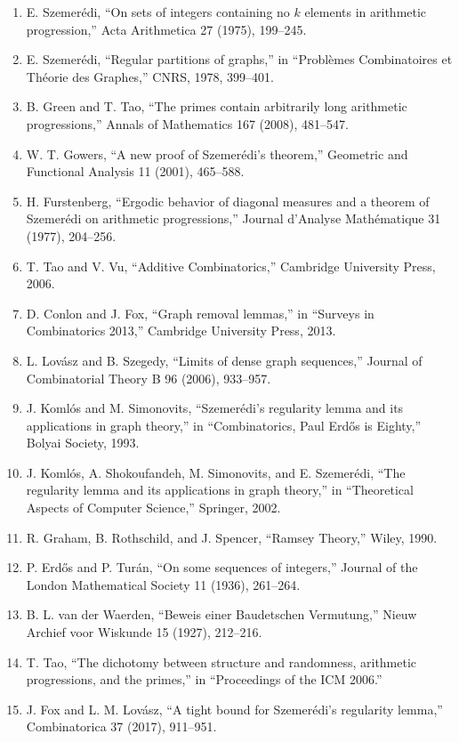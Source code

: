\begin{enumerate}
\item E. Szemer\'edi, ``On sets of integers containing no $k$ elements in arithmetic progression,'' Acta Arithmetica 27 (1975), 199--245.
\item E. Szemer\'edi, ``Regular partitions of graphs,'' in ``Probl\`emes Combinatoires et Th\'eorie des Graphes,'' CNRS, 1978, 399--401.
\item B. Green and T. Tao, ``The primes contain arbitrarily long arithmetic progressions,'' Annals of Mathematics 167 (2008), 481--547.
\item W. T. Gowers, ``A new proof of Szemer\'edi's theorem,'' Geometric and Functional Analysis 11 (2001), 465--588.
\item H. Furstenberg, ``Ergodic behavior of diagonal measures and a theorem of Szemer\'edi on arithmetic progressions,'' Journal d'Analyse Math\'ematique 31 (1977), 204--256.
\item T. Tao and V. Vu, ``Additive Combinatorics,'' Cambridge University Press, 2006.
\item D. Conlon and J. Fox, ``Graph removal lemmas,'' in ``Surveys in Combinatorics 2013,'' Cambridge University Press, 2013.
\item L. Lov\'asz and B. Szegedy, ``Limits of dense graph sequences,'' Journal of Combinatorial Theory B 96 (2006), 933--957.
\item J. Koml\'os and M. Simonovits, ``Szemer\'edi's regularity lemma and its applications in graph theory,'' in ``Combinatorics, Paul Erd\H{o}s is Eighty,'' Bolyai Society, 1993.
\item J. Koml\'os, A. Shokoufandeh, M. Simonovits, and E. Szemer\'edi, ``The regularity lemma and its applications in graph theory,'' in ``Theoretical Aspects of Computer Science,'' Springer, 2002.
\item R. Graham, B. Rothschild, and J. Spencer, ``Ramsey Theory,'' Wiley, 1990.
\item P. Erd\H{o}s and P. Tur\'an, ``On some sequences of integers,'' Journal of the London Mathematical Society 11 (1936), 261--264.
\item B. L. van der Waerden, ``Beweis einer Baudetschen Vermutung,'' Nieuw Archief voor Wiskunde 15 (1927), 212--216.
\item T. Tao, ``The dichotomy between structure and randomness, arithmetic progressions, and the primes,'' in ``Proceedings of the ICM 2006.''
\item J. Fox and L. M. Lov\'asz, ``A tight bound for Szemer\'edi's regularity lemma,'' Combinatorica 37 (2017), 911--951.

\end{enumerate}
